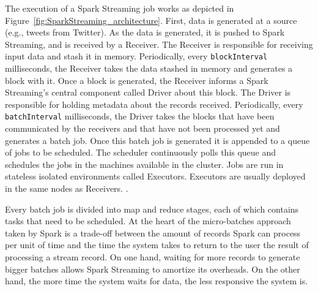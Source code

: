 The execution of a Spark Streaming job works as depicted in Figure~\ref{fig:SparkStreaming_architecture}. 
First, data is generated at a source (e.g., tweets from Twitter). As the data is generated, it is pushed to Spark Streaming, and is received by a Receiver. 
The Receiver is responsible for receiving input data and stash it in memory. Periodically, every \texttt{blockInterval} milliseconds, the Receiver takes the data stashed in memory and generates a block with it.
Once a block is generated, the Receiver informs a Spark Streaming's central component called Driver about this block. The Driver is responsible for holding metadata about the records received. 
Periodically, every \texttt{batchInterval} milliseconds, the Driver takes the blocks that have been communicated by the receivers and that have not been processed yet and generates a batch job. 
Once this batch job is generated it is appended to a queue of jobs to be scheduled. 
The scheduler continuously polls this queue and schedules the jobs in the machines available in the cluster.
Jobs are run in stateless isolated environments called Executors. Executors are usually deployed in the same nodes as Receivers.  .




Every batch job is divided into map and reduce stages, each of which contains tasks that need to be scheduled.
At the heart of the micro-batches approach taken by Spark is a trade-off between the amount of records Spark can process per unit of time and the time the system takes to return to the user the result of processing a stream record.
On one hand, waiting for more records to generate bigger batches allows Spark Streaming to amortize its overheads. On the other hand, the more time the system waits for data, the less responsive the system is.

